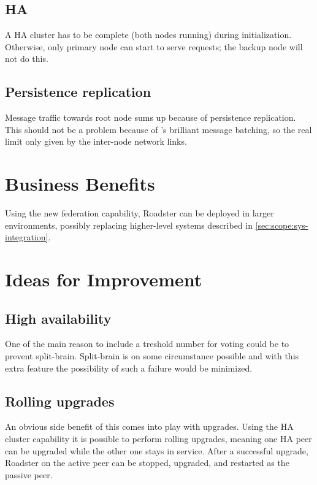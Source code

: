 \subsection{HA}
A HA cluster has to be complete (both nodes running) during initialization.
Otherwise, only primary node can start to serve requests; the backup node will not
do this.


\subsection{Persistence replication}
Message traffic towards root node sums up because of persistence
replication. This should not be a problem because of \zmq's brilliant
message batching, so the real limit only given by the inter-node network links.

\section{Business Benefits}
Using the new federation capability, Roadster can be deployed in larger
environments, possibly replacing higher-level systems described in
\autoref{sec:scope:sys-integration}.

\section{Ideas for Improvement}
\subsection{High availability}
One of the main reason to include a treshold number for voting could be to
prevent split-brain. Split-brain is on some circumstance possible and with this
extra feature the possibility of such a failure would be minimized.

\subsection{Rolling upgrades}
An obvious side benefit of this comes into play with upgrades. Using the HA
cluster capability it is possible to perform rolling upgrades, meaning one HA
peer can be upgraded while the other one stays in service. After a successful
upgrade, Roadster on the active peer can be stopped, upgraded, and restarted as
the passive peer.


